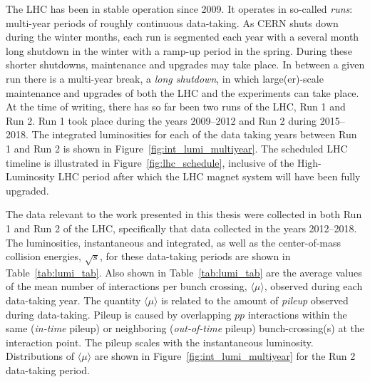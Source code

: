 The LHC has been in stable operation since 2009.
It operates in so-called \textit{runs}: multi-year periods of roughly continuous
data-taking.
As CERN shuts down during the winter months, each run is segmented each year
with a several month long shutdown in the winter with a ramp-up period in the spring.
During these shorter shutdowns, maintenance and upgrades may take place.
In between a given run there is a multi-year break, a \textit{long shutdown},
in which large(er)-scale maintenance and upgrades of both the LHC and the experiments can take place.
At the time of writing, there has so far been two runs of the LHC, Run 1 and Run 2.
Run 1 took place during the years 2009--2012 and Run 2 during 2015--2018.
The integrated luminosities for each of the data taking years between Run 1 and Run 2
is shown in Figure~\ref{fig:int_lumi_multiyear}.
The scheduled LHC timeline is illustrated in Figure~\ref{fig:lhc_schedule}, inclusive of the
High-Luminosity LHC period after which the LHC magnet system will have been fully upgraded.

The data relevant to the work presented in this thesis were collected in both
Run 1 and Run 2 of the LHC, specifically that data collected in the years 2012--2018.
The luminosities, instantaneous and integrated, as well as the center-of-mass collision energies, $\sqrt{s}$, for these data-taking periods are
shown in Table~\ref{tab:lumi_tab}.
Also shown in Table~\ref{tab:lumi_tab} are the average values of the mean number of interactions per bunch
crossing, $\langle \mu \rangle$, observed during each data-taking year. The quantity $\langle \mu \rangle$
is related to the amount of \textit{pileup} observed during data-taking. Pileup is caused
by overlapping $pp$ interactions within the same (\textit{in-time} pileup) or neighboring (\textit{out-of-time} pileup)
bunch-crossing(s) at the interaction point. The pileup scales with the instantaneous luminosity.
Distributions of $\langle \mu \rangle$ are shown in Figure~\ref{fig:int_lumi_multiyear} for
the Run 2 data-taking period.


